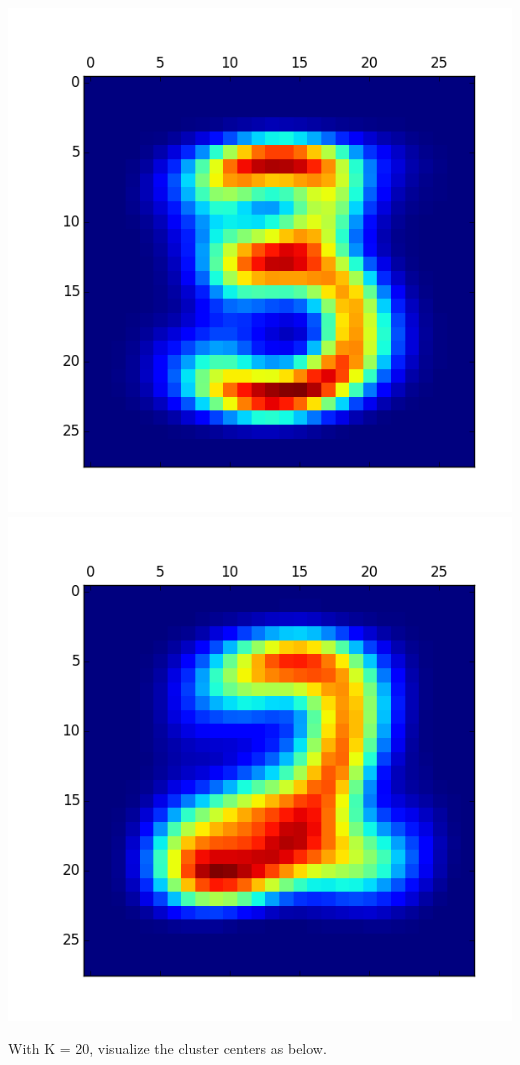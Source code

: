 \documentclass[11pt]{article}
\begin{document}
\begin{itemize}
\includegraphics[scale = 0.5]{14.png}
\includegraphics[scale = 0.5]{15.png}

With K = 20, visualize the cluster centers as below.


\end{itemize}
\end{document}
